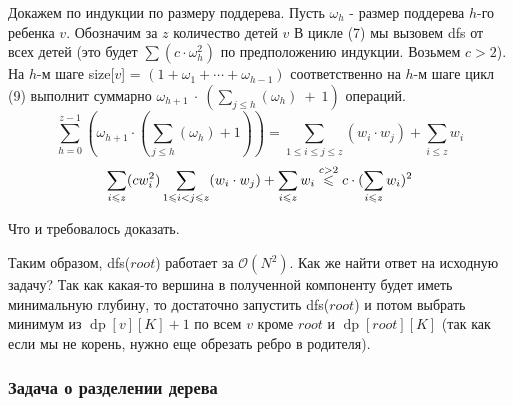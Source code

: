 \documentclass[a4paper,12pt]{article}
\begin{document}
      Докажем по индукции по размеру поддерева. Пусть $\omega_h$ - 
      размер поддерева $h$-го ребенка $v$. Обозначим за $z$ количество 
      детей $v$ В цикле (7) мы вызовем dfs от всех детей (это 
      будет $\sum(c \cdot \omega_h^2)$ по предположению индукции. 
      Возьмем $c > 2$). На $h$-м шаге size[$v$] = 
       $(1 + \omega_1 + \cdots + \omega_{h - 1})$ соответственно на 
       $h$-м шаге цикл (9) выполнит суммарно 
       $\omega_{h + 1}~\cdot~(\sum\limits_{j \leqslant h}(\omega_h)~+~1)$ 
       операций. $$\sum\limits_{h = 0}^{z - 1}(\omega_{h + 1} \cdot 
       (\sum\limits_{j \leqslant h}(\omega_h) + 1)) = \sum\limits_{1 \leqslant i 
       \leqslant j \leqslant z}(w_i \cdot w_j) + \sum_{i \leqslant z}w_i $$
       $$\sum_{i \leqslant z} (c w_i^2) \sum\limits_{1 \leqslant i < j 
       \leqslant z}(w_i \cdot w_j) + \sum_{i \leqslant z}w_i \buildrel 
       c > 2 \over \leqslant c \cdot (\sum\limits_{i \leqslant z} 
       w_i) ^ 2$$

       Что и требовалось доказать.
       
       Таким образом, dfs($root$) работает за $\mathcal{O}(N^2)$. 
       Как же найти ответ на исходную задачу? Так как какая-то вершина в 
       полученной компоненту будет иметь минимальную глубину, то достаточно 
       запустить dfs($root$) и потом выбрать минимум из 
       $\operatorname{dp}[v][K] + 1$ по всем $v$ кроме $root$ и 
       $\operatorname{dp}[root][K]$ (так как если мы не корень, нужно еще 
       обрезать ребро в родителя).

      \subsubsection{Задача о разделении дерева}
\end{document}
